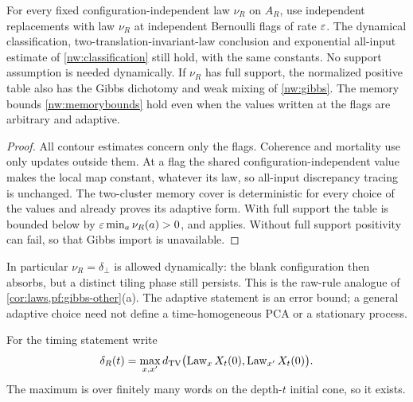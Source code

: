 \begin{corollary}\label{nw:laws}
For every fixed configuration-independent law $\nu_R$ on $A_R$, use independent replacements with law $\nu_R$ at independent Bernoulli flags of rate $\varepsilon$. The dynamical classification, two-translation-invariant-law conclusion and exponential all-input estimate of \cref{nw:classification} still hold, with the same constants. No support assumption is needed dynamically. If $\nu_R$ has full support, the normalized positive table also has the Gibbs dichotomy and weak mixing of \cref{nw:gibbs}. The memory bounds \eqref{nw:memorybounds} hold even when the values written at the flags are arbitrary and adaptive.
\end{corollary}
\begin{proof}
All contour estimates concern only the flags. Coherence and mortality use only updates outside them. At a flag the shared configuration-independent value makes the local map constant, whatever its law, so all-input discrepancy tracing is unchanged. The two-cluster memory cover is deterministic for every choice of the values and already proves its adaptive form. With full support the table is bounded below by $\varepsilon\min_a\nu_R(a)>0$, and \cite[Corollary~13.7]{DM26} applies. Without full support positivity can fail, so that Gibbs import is unavailable.
\end{proof}

In particular $\nu_R=\delta_\bot$ is allowed dynamically: the blank configuration then absorbs, but a distinct tiling phase still persists. This is the raw-rule analogue of \cref{cor:laws,pf:gibbs-other}(a). The adaptive statement is an error bound; a general adaptive choice need not define a time-homogeneous PCA or a stationary process.

For the timing statement write
\[
 \delta_R(t)=\max_{x,x'}d_{\mathrm{TV}}\bigl(
   \operatorname{Law}_xX_t(0),\operatorname{Law}_{x'}X_t(0)\bigr).
\]
The maximum is over finitely many words on the depth-$t$ initial cone, so it exists.

